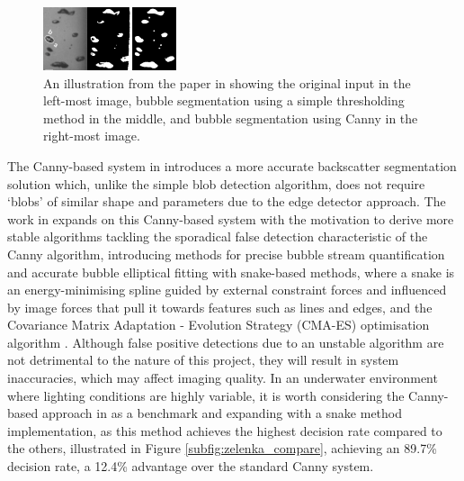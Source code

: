 \begin{figure}[h]
    \centering
    \includegraphics[width=0.35\textwidth]{assets/bubble-segmentation-canny-thresholding.png}
    \caption{An illustration from the paper in \cite{thomanekAutomatedGasBubble2010} showing the original input in the left-most image, bubble segmentation using a simple thresholding method in the middle, and bubble segmentation using Canny in the right-most image.}
    \label{fig:bubble_segment_canny}
\end{figure}

The Canny-based system in \cite{thomanekAutomatedGasBubble2010} introduces a more accurate backscatter segmentation solution which, unlike the simple blob detection algorithm, does not require `blobs' of similar shape and parameters due to the edge detector approach. The work in \cite{zelenkaGasBubbleShape2014} expands on this Canny-based system with the motivation to derive more stable algorithms tackling the sporadical false detection characteristic of the Canny algorithm, introducing methods for precise bubble stream quantification and accurate bubble elliptical fitting with snake-based methods, where a snake is an energy-minimising spline guided by external constraint forces and influenced by image forces that pull it towards features such as lines and edges, and the Covariance Matrix Adaptation - Evolution Strategy (CMA-ES) optimisation algorithm \cite{hansenEvaluatingCMAEvolution2004}. Although false positive detections due to an unstable algorithm are not detrimental to the nature of this project, they will result in system inaccuracies, which may affect imaging quality. In an underwater environment where lighting conditions are highly variable, it is worth considering the Canny-based approach in \cite{zelenkaGasBubbleShape2014} as a benchmark and expanding with a snake method implementation, as this method achieves the highest decision rate compared to the others, illustrated in Figure \ref{subfig:zelenka_compare}, achieving an 89.7\% decision rate, a 12.4\% advantage over the standard Canny system.

